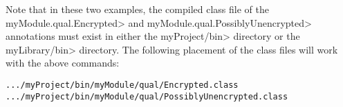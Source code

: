 \begin{enumerate}
Note that in these two examples, the compiled class file of the
\<myModule.qual.Encrypted> and \<myModule.qual.PossiblyUnencrypted> annotations
must exist in either the \<myProject/bin> directory or the \<myLibrary/bin>
directory. The following placement of the class files will work with the above
commands:

\begin{alltt}
  .../myProject/bin/myModule/qual/Encrypted.class
  .../myProject/bin/myModule/qual/PossiblyUnencrypted.class
\end{alltt}

\end{enumerate}



